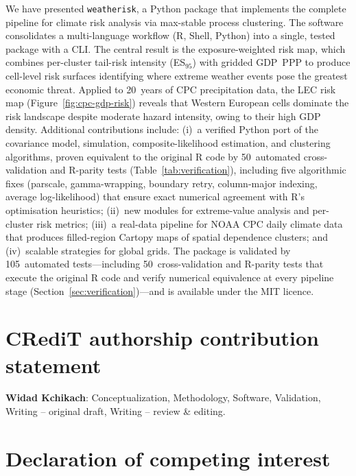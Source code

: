 \documentclass[a4paper]{elsarticle}
\begin{document}
We have presented \texttt{weatherisk}, a Python package that implements
the complete pipeline for climate risk analysis via max-stable process
clustering.
The software consolidates a multi-language workflow (R, Shell, Python)
into a single, tested package with a CLI.
The central result is the exposure-weighted risk map, which combines
per-cluster tail-risk intensity (ES$_{95}$) with gridded GDP~PPP to
produce cell-level risk surfaces identifying where extreme weather
events pose the greatest economic threat.
Applied to 20~years of CPC precipitation data, the LEC risk map
(Figure~\ref{fig:cpc-gdp-risk}) reveals that Western European cells
dominate the risk landscape despite moderate hazard intensity, owing
to their high GDP density.
Additional contributions include:
(i)~a verified Python port of the covariance model, simulation,
    composite-likelihood estimation, and clustering algorithms,
    proven equivalent to the original R code by 50~automated
    cross-validation and R-parity tests
    (Table~\ref{tab:verification}), including five algorithmic
    fixes (parscale, gamma-wrapping, boundary retry,
    column-major indexing, average log-likelihood) that ensure
    exact numerical agreement with R's optimisation heuristics;
(ii)~new modules for extreme-value analysis and per-cluster risk metrics;
(iii)~a real-data pipeline for NOAA CPC daily climate data that produces
     filled-region Cartopy maps of spatial dependence clusters; and
(iv)~scalable strategies for global grids.
The package is validated by 105~automated tests---including
50~cross-validation and R-parity tests that execute the original
R code and verify numerical equivalence at every pipeline stage
(Section~\ref{sec:verification})---and is available under
the MIT licence.

\section*{CRediT authorship contribution statement}

\textbf{Widad Kchikach}: Conceptualization, Methodology, Software, Validation,
Writing -- original draft, Writing -- review \& editing.

\section*{Declaration of competing interest}
\end{document}
